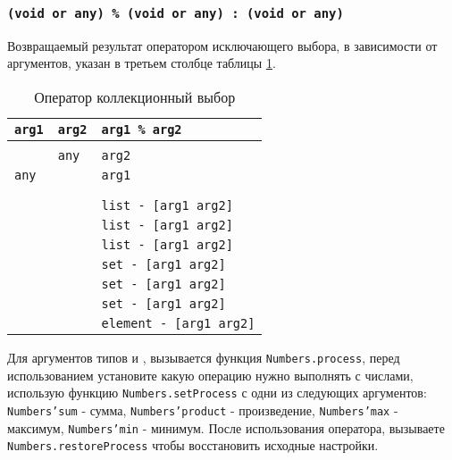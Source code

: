 \subsubsection{\texttt{(void or any) \% (void or any) : (void or any)}}

Возвращаемый результат оператором исключающего выбора, в зависимости от аргументов, указан в третьем столбце таблицы \ref{centhacktable}.

\begin{table}[htb]
	\caption{Оператор коллекционный выбор}
	\label{centhacktable}
	\begin{tabular}{|l|l|l|}
		\hline
		\texttt{arg1} & \texttt{arg2} & \texttt{arg1 \% arg2}			\\ \hline
		\void{}     & \void{}     & \void{}						\\ \hline
		\void{}     & \texttt{any}  & \texttt{arg2}					\\ \hline
		\texttt{any}  & \void{}     & \texttt{arg1}					\\ \hline
		\integer{}  & \integer{}  & \integer{}					\\ \hline
		\double{}   & \double{}   & \double{}					\\ \hline
		\str{}      & \str{}      & \texttt{list - [arg1 arg2]}	\\ \hline
		\listtype{} & \str{}      & \texttt{list - [arg1 arg2]}	\\ \hline
		\listtype{} & \listtype{} & \texttt{list - [arg1 arg2]}	\\ \hline
		\object{}   & \object{}   & \texttt{set - [arg1 arg2]}	\\ \hline
		\set{}      & \object{}   & \texttt{set - [arg1 arg2]}	\\ \hline
		\set{}      & \set{}      & \texttt{set - [arg1 arg2]}	\\ \hline
		\element{}  & \element{}  & \texttt{element - [arg1 arg2]}\\ \hline
	\end{tabular}
	\vspace{0em}
\end{table}

Для аргументов типов \integer{} и \double{}, вызывается функция \texttt{Numbers.process}, перед использованием установите какую операцию нужно выполнять с числами, использую функцию \texttt{Numbers.setProcess} с одни из следующих аргументов: \texttt{Numbers'sum} - сумма, \texttt{Numbers'product} - произведение, \texttt{Numbers'max} - максимум, \texttt{Numbers'min} - минимум. После использования оператора, вызываете \texttt{Numbers.restoreProcess} чтобы восстановить исходные настройки.

